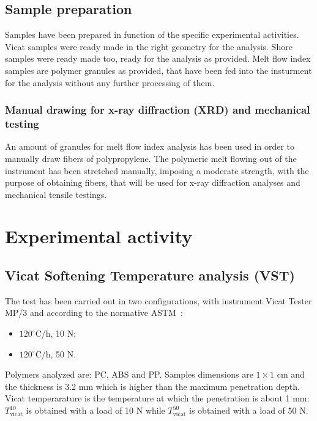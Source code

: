 \documentclass[a4paper, 11pt]{article}
\begin{document}
\subsection{Sample preparation}

Samples have been prepared in function of the specific experimental activities. Vicat samples were ready made in the right geometry for the analysis. Shore samples were ready made too, ready for the analysis as provided. Melt flow index samples are polymer granules as provided, that have been fed into the insturment for the analysis without any further processing of them. 

\subsubsection{Manual drawing for x-ray diffraction (XRD) and mechanical testing}

An amount of granules for melt flow index analysis has been used in order to manually draw fibers of polypropylene. The polymeric melt flowing out of the instrument has been stretched manually, imposing a moderate strength, with the purpose of obtaining fibers, that will be used for x-ray diffraction analyses and mechanical tensile testings.  

\section{Experimental activity}

\subsection{Vicat Softening Temperature analysis (VST)}

The test has been carried out in two configurations, with instrument Vicat Tester MP/3 and according to the normative ASTM~\cite{VICAT}:

\begin{itemize}

\item $120^\circ$C/h, 10 N;

\item $120^\circ$C/h, 50 N.

\end{itemize}
Polymers analyzed are: PC, ABS and PP. Samples dimensions are $1\times1$ cm and the thickness is 3.2 mm which is higher than the maximum penetration depth. Vicat temperarature is the temperature at which the penetration is about 1 mm: $T_\text{vicat}^\text{10}$ is obtained with a load of 10 N while $T_\text{vicat}^\text{50}$ is obtained with a load of 50 N. 
\end{document}

